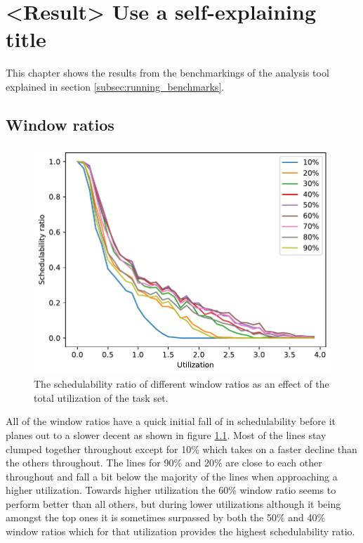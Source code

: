 \documentclass{kththesis}
\begin{document}
\chapter{<Result> Use a self-explaining title}

This chapter shows the results from the benchmarkings of the analysis tool explained in section
\ref{subsec:running_benchmarks}.

\section{Window ratios}\label{sec:result_window_ratios}

\begin{figure}[H]

    \centering

    \includegraphics[width=1.0\linewidth]{images/window_ratio.pdf}

    \caption{The schedulability ratio of different window ratios as an effect of the total
        utilization of the task set.}

    \label{fig:window_ratio}

\end{figure}

All of the window ratios have a quick initial fall of in schedulability before it planes out to a
slower decent as shown in figure \ref{fig:window_ratio}. Most of the lines stay clumped together
throughout except for 10\% which takes on a faster decline than the others throughout. The lines for
90\% and 20\% are close to each other throughout and fall a bit below the majority of the lines when
approaching a higher utilization.  Towards higher utilization the 60\% window ratio seems to perform
better than all others, but during lower utilizations although it being amongst the top ones it is
sometimes surpassed by both the 50\% and 40\% window ratios which for that utilization provides the
highest schedulability ratio.
\end{document}
